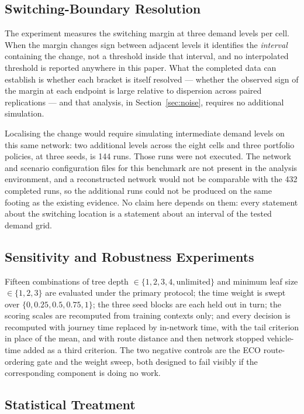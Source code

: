 \subsection{Switching-Boundary Resolution}
\label{sec:boundary-exp}

The experiment measures the switching margin at three demand levels per cell. When the
margin changes sign between adjacent levels it identifies the \emph{interval} containing
the change, not a threshold inside that interval, and no interpolated threshold is
reported anywhere in this paper. What the completed data can establish is whether each
bracket is itself resolved --- whether the observed sign of the margin at each endpoint is
large relative to dispersion across paired replications --- and that analysis, in
Section~\ref{sec:noise}, requires no additional simulation.

Localising the change would require simulating intermediate demand levels on this same
network: two additional levels across the eight cells and three portfolio policies, at
three seeds, is 144 runs. Those runs were not executed. The network and scenario
configuration files for this benchmark are not present in the analysis environment, and a
reconstructed network would not be comparable with the 432 completed runs, so the
additional runs could not be produced on the same footing as the existing evidence. No
claim here depends on them: every statement about the switching location is a statement
about an interval of the tested demand grid.

\subsection{Sensitivity and Robustness Experiments}

Fifteen combinations of tree depth $\in\{1,2,3,4,\text{unlimited}\}$ and minimum leaf size
$\in\{1,2,3\}$ are evaluated under the primary protocol; the time weight is swept over
$\{0,0.25,0.5,0.75,1\}$; the three seed blocks are each held out in turn; the scoring
scales are recomputed from training contexts only; and every decision is recomputed with
journey time replaced by in-network time, with the tail criterion in place of the mean,
and with route distance and then network stopped vehicle-time added as a third criterion.
The two negative controls are the ECO route-ordering gate and the weight sweep, both
designed to fail visibly if the corresponding component is doing no work.

\subsection{Statistical Treatment}


